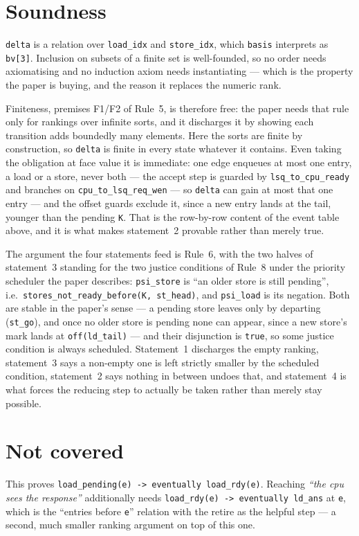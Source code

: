 \documentclass[11pt]{article}
\begin{document}
\section{Soundness}

\texttt{delta} is a relation over \texttt{load_idx} and \texttt{store_idx},
which \texttt{basis} interprets as \texttt{bv[3]}.
Inclusion on subsets of a finite set is well-founded, so no order needs
axiomatising and no induction axiom needs instantiating --- which is the
property the paper is buying, and the reason it replaces the numeric
rank.

Finiteness, premises F1/F2 of Rule~5, is therefore free: the paper needs
that rule only for rankings over infinite sorts, and it discharges it by
showing each transition adds boundedly many elements. Here the sorts are
finite by construction, so \texttt{delta} is finite in every state
whatever it contains. Even taking the obligation at face value it is
immediate: one edge enqueues at most one entry, a load or a store, never
both --- the accept step is guarded by \texttt{lsq_to_cpu_ready} and
branches on \texttt{cpu_to_lsq_req_wen} --- so \texttt{delta} can gain
at most that one entry --- and the offset
guards exclude it, since a new entry lands at the tail, younger than the
pending \texttt{K}. That is the row-by-row content of the event table
above, and it is what makes statement~2 provable rather than merely
true.

The argument the four statements feed is Rule~6, with the two halves of
statement~3 standing for the two justice conditions of Rule~8 under the
priority scheduler the paper describes: \texttt{psi_store} is ``an older
store is still pending'', i.e.\ \texttt{stores_not_ready_before(K, st_head)},
and \texttt{psi_load} is its negation. Both are stable in the paper's
sense --- a pending store leaves only by departing (\texttt{st_go}),
and once no older store is pending none can appear, since a new store's
mark lands at \texttt{off(ld_tail)} --- and their disjunction is
\texttt{true}, so some justice condition is always scheduled.
Statement~1 discharges the empty ranking, statement~3 says a non-empty
one is left strictly smaller by the scheduled condition, statement~2
says nothing in between undoes that, and statement~4 is what forces the
reducing step to actually be taken rather than merely stay possible.

\section{Not covered}

This proves \texttt{load_pending(e) -> eventually load_rdy(e)}. Reaching
\emph{``the cpu sees the response''} additionally needs
\texttt{load_rdy(e) -> eventually ld_ans} at \texttt{e}, which is the
``entries before \texttt{e}'' relation with the retire as the helpful
step --- a second, much smaller ranking argument on top of this one.
\end{document}
